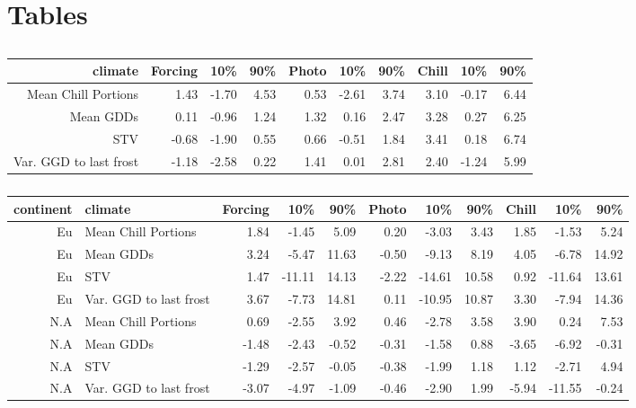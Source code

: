 \documentclass[12pt]{article}\usepackage[]{graphicx}\usepackage[]{color}
\begin{document}
\pagebreak
\iffalse 

\section*{Tables}
\begin{table}
\centering
\begin{tabular}{|r|rrr|rrr|rrr|}
  \hline
  climate & Forcing & 10\% & 90\% & Photo & 10\% & 90\% & Chill & 10\% & 90\% \\ 
  \hline
 Mean Chill Portions & 1.43 & -1.70 & 4.53 & 0.53 & -2.61 & 3.74 & 3.10 & -0.17 & 6.44 \\ 
  Mean GDDs & 0.11 & -0.96 & 1.24 & 1.32 & 0.16 & 2.47 & 3.28 & 0.27 & 6.25 \\ 
   STV & -0.68 & -1.90 & 0.55 & 0.66 & -0.51 & 1.84 & 3.41 & 0.18 & 6.74 \\ 
   Var. GGD to last frost & -1.18 & -2.58 & 0.22 & 1.41 & 0.01 & 2.81 & 2.40 & -1.24 & 5.99 \\ 
   \hline
\end{tabular}
\label{tab:outfull}
\caption{}
\end{table}

\begin{table}
\centering
\begin{tabular}{|r|p{3 cm}|rrr|rrr|rrr|}
  \hline
  \hline
 continent & climate & Forcing & 10\% & 90\% & Photo & 10\% & 90\% & Chill & 10\% & 90\% \\ 
  \hline
 Eu & Mean Chill Portions & 1.84 & -1.45 & 5.09 & 0.20 & -3.03 & 3.43 & 1.85 & -1.53 & 5.24 \\ 
 \hline
    Eu & Mean GDDs & 3.24 & -5.47 & 11.63 & -0.50 & -9.13 & 8.19 & 4.05 & -6.78 & 14.92 \\ 
    \hline
    Eu & STV & 1.47 & -11.11 & 14.13 & -2.22 & -14.61 & 10.58 & 0.92 & -11.64 & 13.61 \\ 
    \hline
    Eu & Var. GGD to last frost & 3.67 & -7.73 & 14.81 & 0.11 & -10.95 & 10.87 & 3.30 & -7.94 & 14.36 \\ 
    \hline
    \hline
    N.A & Mean Chill Portions & 0.69 & -2.55 & 3.92 & 0.46 & -2.78 & 3.58 & 3.90 & 0.24 & 7.53 \\ 
    \hline
    N.A & Mean GDDs & -1.48 & -2.43 & -0.52 & -0.31 & -1.58 & 0.88 & -3.65 & -6.92 & -0.31 \\ 
    \hline
    N.A & STV & -1.29 & -2.57 & -0.05 & -0.38 & -1.99 & 1.18 & 1.12 & -2.71 & 4.94 \\ 
    \hline
    N.A & Var. GGD to last frost & -3.07 & -4.97 & -1.09 & -0.46 & -2.90 & 1.99 & -5.94 & -11.55 & -0.24 \\ 
  \hline
   \hline
\end{tabular}
\label{tab:outcont}
\caption{}
\end{table}
\end{document}
